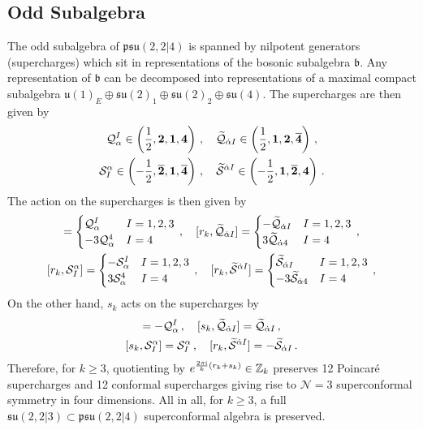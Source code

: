 \documentclass[main.tex]{subfiles}
\begin{document}
\subsection{Odd Subalgebra} 
The odd subalgebra of $\mathfrak{psu}(2,2|4)$ is spanned by nilpotent generators (supercharges) which sit in representations of the bosonic subalgebra $\mathfrak{b}$. Any representation of $\mathfrak{b}$ can be decomposed into representations of a maximal compact subalgebra $\mathfrak{u}(1)_E\oplus\mathfrak{su}(2)_1\oplus \mathfrak{su}(2)_2\oplus \mathfrak{su}(4)$. The supercharges are then given by
\begin{gather}
\mathcal{Q}_{\alpha}^I\in\left(\frac{1}{2},\mathbf{2},\mathbf{1},\mathbf{4}\right)\,,\quad \widetilde{\mathcal{Q}}_{\dot\alpha I} \in\left(\frac{1}{2},\mathbf{1},\mathbf{2},\mathbf{\overline{4}}\right)\,,\\ \mathcal{S}^{\alpha}_I\in\left(-\frac{1}{2},\mathbf{\overline{2}},\mathbf{1},\mathbf{\overline{4}}\right)\,,\quad \widetilde{\mathcal{S}}^{\dot\alpha I}\in\left(-\frac{1}{2},\mathbf{1},\mathbf{\overline{2}},\mathbf{4}\right)\,.
\end{gather}
The action on the supercharges is then given by
\begin{gather}
[r_k,\Qfour^{I}_{\alpha}] = \begin{cases}
\Qfour^{I}_{\alpha} & I=1,2,3\\
-3\Qfour^{4}_{\alpha} &I=4
\end{cases}\,,\quad[r_k,\widetilde{\Qfour}_{\dot\alpha I}]=\begin{cases}
-\widetilde{\Qfour}_{\dot\alpha I} & I=1,2,3\\
3\widetilde{\Qfour}_{\dot\alpha 4} &I=4
\end{cases} \, ,\\
[r_k,\Sfour_{I}^{\alpha}]=\begin{cases}
-\Sfour^{I}_{\alpha} & I=1,2,3\\
3\Sfour^{4}_{\alpha} &I=4
\end{cases}\,,\quad[r_k,\widetilde{\Sfour}^{\dot\alpha I}] = \begin{cases}
\widetilde{\Sfour}_{\dot\alpha I} & I=1,2,3\\
-3\widetilde{\Sfour}_{\dot\alpha 4} &I=4
\end{cases} \, ,
\end{gather}
On the other hand, $s_k$ acts on the supercharges by \cite{Kapustin:2006pk,Garcia-Etxebarria:2015wns,Garcia-Etxebarria:2016erx}
\begin{gather}
[s_k,\Qfour^{I}_{\alpha}]=-\Qfour^{I}_{\alpha} \,,\quad  [s_k,\widetilde{\Qfour}_{\dot\alpha I}]=\widetilde{\Qfour}_{\dot\alpha I} \, ,\\ [s_k,\Sfour_{I}^{\alpha}]=\Sfour_{I}^{\alpha} \,,\quad  [r_k,\widetilde{\Sfour}^{\dot\alpha I} ]=-\widetilde{\Sfour}_{\dot\alpha I} \,.
\end{gather}
Therefore, for $k\geq 3$, quotienting by $e^{\frac{2\pi\mathrm{i}}{k}(r_k+ s_k)}\in\mathbb{Z}_k$ preserves 12 Poincar\'e supercharges and 12 conformal supercharges giving rise to $\mathcal{N}=3$ superconformal symmetry in four dimensions.
All in all, for $k\geq3$, a full $\mathfrak{su}(2,2|3)\subset\mathfrak{psu}(2,2|4)$ superconformal algebra is preserved.
\end{document}

